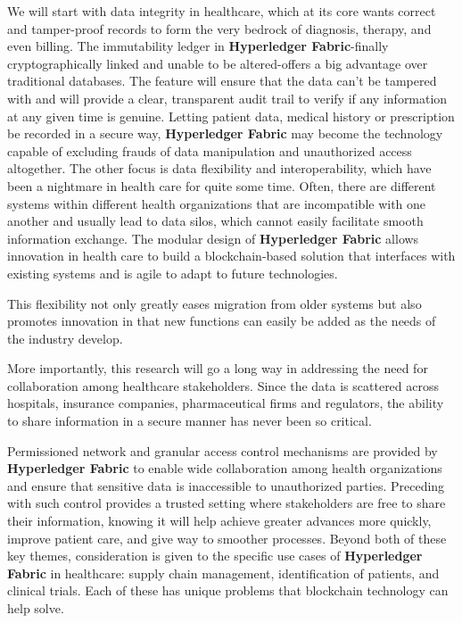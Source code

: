 We will start with data integrity in healthcare, which at its core wants correct and tamper-proof records to form the very bedrock of diagnosis, therapy, and even billing. The immutability ledger in \textbf{Hyperledger Fabric}-finally cryptographically linked and unable to be altered-offers a big advantage over traditional databases. The feature will ensure that the data can't be tampered with and will provide a clear, transparent audit trail to verify if any information at any given time is genuine. Letting patient data, medical history or prescription be recorded in a secure way, \textbf{Hyperledger Fabric} may become the technology capable of excluding frauds of data manipulation and unauthorized access altogether. The other focus is data flexibility and interoperability, which have been a nightmare in health care for quite some time. Often, there are different systems within different health organizations that are incompatible with one another and usually lead to data silos, which cannot easily facilitate smooth information exchange. The modular design of \textbf{Hyperledger Fabric} allows innovation in health care to build a blockchain-based solution that interfaces with existing systems and is agile to adapt to future technologies.

This flexibility not only greatly eases migration from older systems but also promotes innovation in that new functions can easily be added as the needs of the industry develop.

More importantly, this research will go a long way in addressing the need for collaboration among healthcare stakeholders. Since the data is scattered across hospitals, insurance companies, pharmaceutical firms and regulators, the ability to share information in a secure manner has never been so critical.

Permissioned network and granular access control mechanisms are provided by \textbf{Hyperledger Fabric} to enable wide collaboration among health organizations and ensure that sensitive data is inaccessible to unauthorized parties. Preceding with such control provides a trusted setting where stakeholders are free to share their information, knowing it will help achieve greater advances more quickly, improve patient care, and give way to smoother processes. Beyond both of these key themes, consideration is given to the specific use cases of \textbf{Hyperledger Fabric} in healthcare: supply chain management, identification of patients, and clinical trials. Each of these has unique problems that blockchain technology can help solve.

